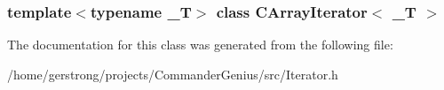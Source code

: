 \subsubsection*{template$<$typename \_\-T$>$ class CArrayIterator$<$ \_\-T $>$}



The documentation for this class was generated from the following file:\begin{DoxyCompactItemize}
\item 
/home/gerstrong/projects/CommanderGenius/src/Iterator.h\end{DoxyCompactItemize}
